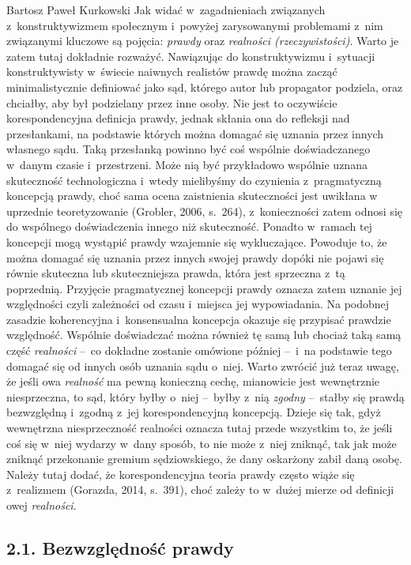 \begin{artplenv}{Bartosz Paweł Kurkowski}
Jak widać w~zagadnieniach związanych z~konstruktywizmem społecznym i~powyżej zarysowanymi problemami z~nim związanymi
kluczowe są pojęcia: \textit{prawdy }oraz\textit{ realności (rzeczywistości)}. Warto je zatem tutaj dokładnie rozważyć.
Nawiązując do konstruktywizmu i~sytuacji konstruktywisty w~świecie naiwnych realistów prawdę można zacząć
minimalistycznie definiować jako sąd, którego autor lub propagator podziela, oraz chciałby, aby był podzielany przez
inne osoby. Nie jest to oczywiście korespondencyjna definicja prawdy, jednak skłania ona do refleksji nad przesłankami,
na podstawie których można domagać się uznania przez innych własnego sądu. Taką przesłanką powinno być coś wspólnie
doświadczanego w~danym czasie i~przestrzeni. Może nią być przykładowo wspólnie uznana skuteczność
technologiczna i~wtedy mielibyśmy do czynienia z~pragmatyczną koncepcją prawdy,
choć sama ocena zaistnienia skuteczności jest uwikłana w
uprzednie teoretyzowanie \label{ref:RNDAZOAoiyJgA}(Grobler, 2006, s.~264), z~konieczności zatem odnosi się do wspólnego
doświadczenia innego niż skuteczność. Ponadto w~ramach tej koncepcji mogą wystąpić prawdy wzajemnie się wykluczające.
Powoduje to, że można domagać się uznania przez innych swojej prawdy dopóki nie pojawi się równie skuteczna lub
skuteczniejsza prawda, która jest sprzeczna z~tą poprzednią. Przyjęcie pragmatycznej koncepcji prawdy oznacza zatem
uznanie jej względności czyli zależności od czasu i~miejsca jej wypowiadania. Na podobnej zasadzie koherencyjna
i~konsensualna koncepcja okazuje się przypisać prawdzie względność. Wspólnie doświadczać można również tę samą lub
chociaż taką samą część \textit{realności} --~co dokładne zostanie omówione później --~i~na podstawie tego domagać się od
innych osób uznania sądu o~niej. Warto zwrócić już teraz uwagę, że jeśli owa \textit{realność} ma pewną konieczną
cechę, mianowicie jest wewnętrznie niesprzeczna, to sąd, który byłby o~niej --~byłby z~nią \textit{zgodny} --~stałby się
prawdą bezwzględną i~zgodną z~jej korespondencyjną koncepcją. Dzieje się tak, gdyż wewnętrzna niesprzeczność realności
oznacza tutaj przede wszystkim to, że jeśli coś się w~niej wydarzy w~dany sposób, to nie może z~niej zniknąć, tak jak
może zniknąć przekonanie gremium sędziowskiego, że dany oskarżony zabił daną osobę. Należy tutaj dodać, że
korespondencyjna teoria prawdy często wiąże się z~realizmem \label{ref:RNDWUfAn1YBkZ}(Gorazda, 2014, s.~391), choć
zależy to w~dużej mierze od definicji owej \textit{realności}.

\subsection{2.1. Bezwzględność prawdy}


\end{artplenv}
